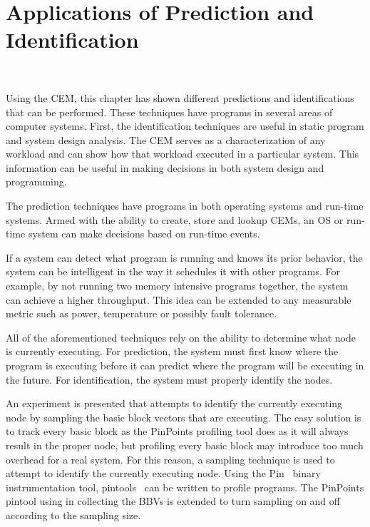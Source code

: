 \section{Applications of Prediction and Identification}~\label{sec:pred_applications}

Using the CEM, this chapter has shown different predictions and
identifications that can be performed. These techniques have
programs in several areas of computer systems.
First, the identification techniques are useful in static program and
system design analysis. The CEM serves as a characterization of any
workload and can show how that workload executed in a particular
system. This information can be useful in making decisions in both
system design and programming.

The prediction techniques have programs in both operating systems
and run-time systems. Armed with the ability to create, store and
lookup CEMs, an OS or run-time system can make decisions based on
run-time events.

If a system can detect what program is running and knows its prior
behavior, the system can be intelligent in the way it schedules it
with other programs.  For example, by not running two memory
intensive programs together, the system can achieve a higher
throughput. This idea can be extended to any measurable metric such as
power, temperature or possibly fault tolerance.

All of the
aforementioned techniques rely on the ability to determine what node
is currently executing. For prediction, the system must first know
where the program is executing before it can predict where the
program will be executing in the future. For identification, the
system must properly identify the nodes.

An experiment is presented
that attempts to identify the currently executing node by sampling the
basic block vectors that are executing. The easy solution is to track every
basic block as the PinPoints profiling tool does as it will always
result in the proper node, but profiling every basic block may introduce
too much overhead for a real
system. For this reason, a sampling technique is used to attempt to
identify the currently executing node. Using the Pin~\cite{pin-web} binary
instrumentation tool, pintools~\cite{pintool} can be written to profile
programs. The PinPoints pintool using in collecting the BBVs is extended to turn
sampling on and off according to the sampling size.

